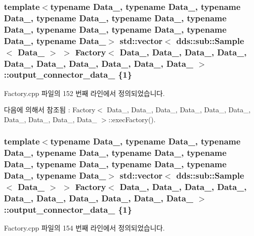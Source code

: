 \subsubsection[{\texorpdfstring{output\+\_\+connector\+\_\+data\+\_\+2}{output_connector_data_2}}]{\setlength{\rightskip}{0pt plus 5cm}template$<$typename Data\+\_, typename Data\+\_, typename Data\+\_, typename Data\+\_, typename Data\+\_, typename Data\+\_, typename Data\+\_, typename Data\+\_, typename Data\+\_, typename Data\+\_$>$ std\+::vector$<$ dds\+::sub\+::\+Sample$<$ Data\+\_ $>$ $>$ {\bf Factory}$<$ Data\+\_, Data\+\_, Data\+\_, Data\+\_, Data\+\_, Data\+\_, Data\+\_, Data\+\_, Data\+\_, Data\+\_ $>$\+::output\+\_\+connector\+\_\+data\+\_ \{1\}}\hypertarget{classFactory_a9f636cd7fe32df0bd19e4ec9490d5ccd}{}\label{classFactory_a9f636cd7fe32df0bd19e4ec9490d5ccd}


Factory.\+cpp 파일의 152 번째 라인에서 정의되었습니다.



다음에 의해서 참조됨 \+:  Factory$<$ Data\+\_, Data\+\_, Data\+\_, Data\+\_, Data\+\_, Data\+\_, Data\+\_, Data\+\_, Data\+\_, Data\+\_ $>$\+::exec\+Factory().

\subsubsection[{\texorpdfstring{output\+\_\+connector\+\_\+data\+\_\+3}{output_connector_data_3}}]{\setlength{\rightskip}{0pt plus 5cm}template$<$typename Data\+\_, typename Data\+\_, typename Data\+\_, typename Data\+\_, typename Data\+\_, typename Data\+\_, typename Data\+\_, typename Data\+\_, typename Data\+\_, typename Data\+\_$>$ std\+::vector$<$ dds\+::sub\+::\+Sample$<$ Data\+\_ $>$ $>$ {\bf Factory}$<$ Data\+\_, Data\+\_, Data\+\_, Data\+\_, Data\+\_, Data\+\_, Data\+\_, Data\+\_, Data\+\_, Data\+\_ $>$\+::output\+\_\+connector\+\_\+data\+\_ \{1\}}\hypertarget{classFactory_acb470e6e5293ed45c2a1284015b8a63f}{}\label{classFactory_acb470e6e5293ed45c2a1284015b8a63f}


Factory.\+cpp 파일의 154 번째 라인에서 정의되었습니다.



